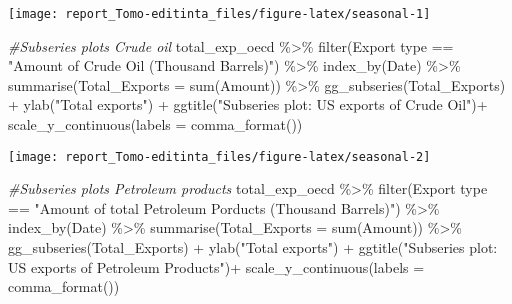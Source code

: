 \documentclass[
]{article}
\newenvironment{Shaded}{\begin{snugshade}}{\end{snugshade}}
\newcommand{\AttributeTok}[1]{\textcolor[rgb]{0.77,0.63,0.00}{#1}}
\newcommand{\CommentTok}[1]{\textcolor[rgb]{0.56,0.35,0.01}{\textit{#1}}}
\newcommand{\FunctionTok}[1]{\textcolor[rgb]{0.00,0.00,0.00}{#1}}
\newcommand{\NormalTok}[1]{#1}
\newcommand{\SpecialCharTok}[1]{\textcolor[rgb]{0.00,0.00,0.00}{#1}}
\newcommand{\StringTok}[1]{\textcolor[rgb]{0.31,0.60,0.02}{#1}}
\begin{document}
\begin{center}\texttt{[image: report\_Tomo-editinta\_files/figure-latex/seasonal-1]} \end{center}

\begin{Shaded}
\begin{Highlighting}[]
\CommentTok{\#Subseries plots Crude oil}
\NormalTok{total\_exp\_oecd }\SpecialCharTok{\%\textgreater{}\%} \FunctionTok{filter}\NormalTok{(}\StringTok{\textasciigrave{}}\AttributeTok{Export type}\StringTok{\textasciigrave{}} \SpecialCharTok{==} \StringTok{"Amount of Crude Oil (Thousand Barrels)"}\NormalTok{) }\SpecialCharTok{\%\textgreater{}\%} 
  \FunctionTok{index\_by}\NormalTok{(Date) }\SpecialCharTok{\%\textgreater{}\%} 
  \FunctionTok{summarise}\NormalTok{(}\AttributeTok{Total\_Exports =} \FunctionTok{sum}\NormalTok{(}\StringTok{\textasciigrave{}}\AttributeTok{Amount}\StringTok{\textasciigrave{}}\NormalTok{)) }\SpecialCharTok{\%\textgreater{}\%} 
  \FunctionTok{gg\_subseries}\NormalTok{(Total\_Exports) }\SpecialCharTok{+} 
  \FunctionTok{ylab}\NormalTok{(}\StringTok{"Total exports"}\NormalTok{) }\SpecialCharTok{+} 
  \FunctionTok{ggtitle}\NormalTok{(}\StringTok{"Subseries plot: US exports of Crude Oil"}\NormalTok{)}\SpecialCharTok{+}
  \FunctionTok{scale\_y\_continuous}\NormalTok{(}\AttributeTok{labels =} \FunctionTok{comma\_format}\NormalTok{())}
\end{Highlighting}
\end{Shaded}

\begin{center}\texttt{[image: report\_Tomo-editinta\_files/figure-latex/seasonal-2]} \end{center}

\begin{Shaded}
\begin{Highlighting}[]
\CommentTok{\#Subseries plots Petroleum products}
\NormalTok{total\_exp\_oecd }\SpecialCharTok{\%\textgreater{}\%} \FunctionTok{filter}\NormalTok{(}\StringTok{\textasciigrave{}}\AttributeTok{Export type}\StringTok{\textasciigrave{}} \SpecialCharTok{==} \StringTok{"Amount of total Petroleum Porducts (Thousand Barrels)"}\NormalTok{) }\SpecialCharTok{\%\textgreater{}\%} 
  \FunctionTok{index\_by}\NormalTok{(Date) }\SpecialCharTok{\%\textgreater{}\%} 
  \FunctionTok{summarise}\NormalTok{(}\AttributeTok{Total\_Exports =} \FunctionTok{sum}\NormalTok{(}\StringTok{\textasciigrave{}}\AttributeTok{Amount}\StringTok{\textasciigrave{}}\NormalTok{)) }\SpecialCharTok{\%\textgreater{}\%} 
  \FunctionTok{gg\_subseries}\NormalTok{(Total\_Exports) }\SpecialCharTok{+} 
  \FunctionTok{ylab}\NormalTok{(}\StringTok{"Total exports"}\NormalTok{) }\SpecialCharTok{+} 
  \FunctionTok{ggtitle}\NormalTok{(}\StringTok{"Subseries plot: US exports of Petroleum Products"}\NormalTok{)}\SpecialCharTok{+}
  \FunctionTok{scale\_y\_continuous}\NormalTok{(}\AttributeTok{labels =} \FunctionTok{comma\_format}\NormalTok{())}
\end{Highlighting}
\end{Shaded}
\end{document}
